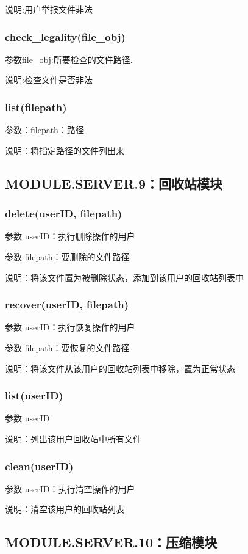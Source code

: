 说明:用户举报文件非法

\subsubsection{check\_legality(file\_obj)}
参数file\_obj:所要检查的文件路径.

说明:检查文件是否非法


\subsubsection{list(filepath)}
参数：filepath：路径

说明：将指定路径的文件列出来


\subsection{MODULE.SERVER.9：回收站模块}

\subsubsection{delete(userID, filepath)}
参数 userID：执行删除操作的用户

参数 filepath：要删除的文件路径

说明：将该文件置为被删除状态，添加到该用户的回收站列表中

\subsubsection{recover(userID, filepath)}
参数 userID：执行恢复操作的用户

参数 filepath：要恢复的文件路径

说明：将该文件从该用户的回收站列表中移除，置为正常状态

\subsubsection{list(userID)}
参数 userID

说明：列出该用户回收站中所有文件

\subsubsection{clean(userID)}
参数 userID：执行清空操作的用户

说明：清空该用户的回收站列表

\subsection{MODULE.SERVER.10：压缩模块}
